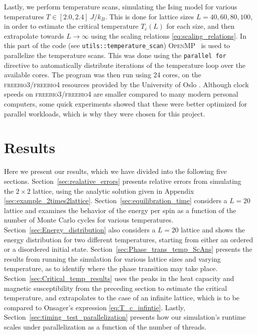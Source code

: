 \documentclass[english,notitlepage,reprint]{revtex4-2}  %
\begin{document}
Lastly, we perform temperature scans, simulating the Ising model for various temperatures \(T\in[2.0, 2.4]\ \si{J/k_B}\).
This is done for lattice sizes \(L=40, 60, 80, 100\), in order to estimate the critical temperature \(T_c(L)\) for each size, and then extrapolate towards \(L\rightarrow\infty\) using the scaling relations \eqref{eq:scaling_relations}.
In this part of the code (see \texttt{utils::temperature\_scan}) \textsc{OpenMP}~\cite{openmp} is used to parallelize the temperature scans.
This was done using the \texttt{parallel for} directive to automatically distribute iterations of the temperature loop over the available cores.
The program was then run using 24 cores, on the \textsc{freebio3}/\textsc{freebio4} resources provided by the University of Oslo \cite{lightweight_hpc_uio}.
Although clock speeds on \textsc{freebio3}/\textsc{freebio4} are smaller compared to many modern personal computers, some quick experiments showed that these were better optimized for parallel workloads, which is why they were chosen for this project.



\section{Results}
Here we present our results, which we have divided into the following five sections. 
Section~\ref{sec:realative_errors} presents relative errors from simulating the \(2\times 2\) lattice, using the analytic solution given in Appendix \ref{sec:example_2times2lattice}.
Section~\ref{sec:equilibration_time} considers a \(L=20\) lattice and examines the behavior of the energy per spin as a function of the number of Monte Carlo cycles for various temperatures. 
Section~\ref{sec:Energy_distribution} also considers a \(L=20\) lattice and shows the energy distribution for two different temperatures, starting from either an ordered or a disordered initial state. 
Section~\ref{sec:Phase_trans_temp_ScAns} presents the results from running the simulation for various lattice sizes and varying temperature, as to identify where the phase transition may take place.
Section~\ref{sec:Critical_temp_results} uses the peaks in the heat capacity and magnetic susceptibility from the preceding section to estimate the critical temperature, and extrapolates to the case of an infinite lattice, which is to be compared to Onsager's expression \eqref{eq:T_c_infintie}.
Lastly, Section~\ref{sec:timing_test_parallelization} presents how our simulation's runtime scales under parallelization as a function of the number of threads.
\end{document}
